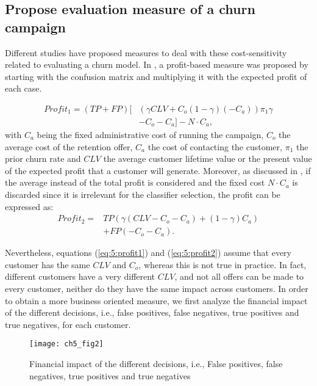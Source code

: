 \subsection{Propose evaluation measure of a churn campaign}
\label{sec:5:1:evaluation}
	
Different studies have proposed measures to deal with these cost-sensitivity related to
evaluating a churn model. In \citep{Neslin2006}, a profit-based measure was proposed by starting 
with the confusion matrix and multiplying it with the expected profit of each case.

\begin{align}\label{eq:5:profit1}
 Profit_1 = (TP+FP)\bigg[ & \left(\gamma CLV + C_o(1-\gamma)(-C_a)\right)\pi_1\gamma \nonumber \\
 & -C_o-C_a\bigg]-N\cdot C_a,
\end{align}
with $C_a$ being the fixed administrative cost of running the campaign, $C_o$ the average 
cost of the retention offer, $C_a$ the cost of contacting the customer, $\pi_1$ the prior churn rate 
and $CLV$ the average customer lifetime value or the present value of the expected profit that a 
customer will generate. Moreover, as discussed in \citep{Verbraken2013}, if the average instead of 
the total profit is considered and the fixed cost $N\cdot C_a$ is discarded since it is irrelevant 
for the classifier selection, the profit can be expressed as:
\begin{align}\label{eq:5:profit2}
 Profit_2 = &TP\left(\gamma(CLV-C_o-C_a)+(1-\gamma)C_a \right) \nonumber \\
 &+FP(-C_o-C_a).
\end{align}

Nevertheless, equations (\ref{eq:5:profit1}) and (\ref{eq:5:profit2}) assume that every customer 
has the same $CLV$ and $C_o$, whereas this is not true in practice. In fact, different customers 
have a very different $CLV$, and not all offers can be made to every customer, neither do they have 
the same impact across customers. In order to obtain a more business oriented measure, we first 
analyze the financial impact of the different decisions, i.e., false positives, false negatives, 
true positives and true negatives, for each customer.	

\begin{figure}[t]
  \centering
  \texttt{[image: ch5\_fig2]}
  \caption{Financial impact of the different decisions, i.e., False positives, false negatives, 
  true 	positives and true negatives}
	\label{fig:ch5:2}
\end{figure}

